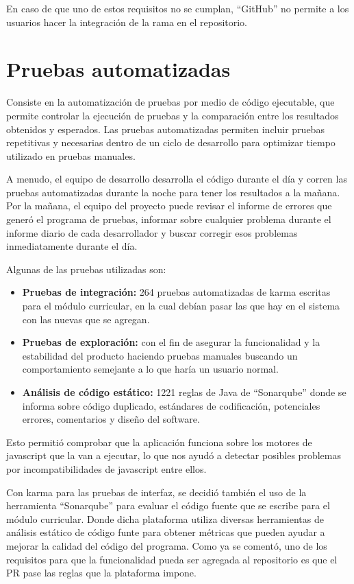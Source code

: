 En caso de que uno de estos requisitos no se cumplan, \enquote{GitHub} no permite a los usuarios hacer la integración de la rama en el repositorio.

\section{Pruebas automatizadas}
Consiste en la automatización de pruebas por medio de código ejecutable, que permite controlar la ejecución de pruebas y la comparación entre los resultados obtenidos y esperados. Las pruebas automatizadas permiten incluir pruebas repetitivas y necesarias dentro de un ciclo de desarrollo para optimizar tiempo utilizado en pruebas manuales\citep{crispin2009agile}.

A menudo, el equipo de desarrollo desarrolla el código durante el día y corren las pruebas automatizadas durante la noche para tener los resultados a la mañana. Por la mañana, el equipo del proyecto puede revisar el informe de errores que generó el programa de pruebas, informar sobre cualquier problema durante el informe diario de cada desarrollador y buscar corregir esos problemas inmediatamente durante el día.

Algunas de las pruebas utilizadas son:
\begin{itemize}
	\item \textbf{Pruebas de integración:} 264 pruebas automatizadas de karma escritas para el módulo curricular, en la cual debían pasar las que hay en el sistema con las nuevas que se agregan.
	\item \textbf{Pruebas de exploración:} con el fin de asegurar la funcionalidad y la estabilidad del producto haciendo pruebas manuales buscando un comportamiento semejante a lo que haría un usuario normal.
	\item \textbf{Análisis de código estático:} 1221 reglas de Java de \enquote{Sonarqube} donde se informa sobre código duplicado, estándares de codificación, potenciales errores, comentarios y diseño del software.
\end{itemize}

Esto permitió comprobar que la aplicación funciona sobre los motores de javascript que la van a ejecutar, lo que nos ayudó a detectar posibles problemas por incompatibilidades de javascript entre ellos.

Con karma para las pruebas de interfaz, se decidió también el uso de la herramienta \enquote{Sonarqube} para evaluar el código fuente que se escribe para el módulo curricular. Donde dicha plataforma utiliza diversas herramientas de análisis estático de código funte para obtener métricas que pueden ayudar a mejorar la calidad del código del programa. Como ya se comentó, uno de los requisitos para que la funcionalidad pueda ser agregada al repositorio es que el PR pase las reglas que la plataforma impone.

